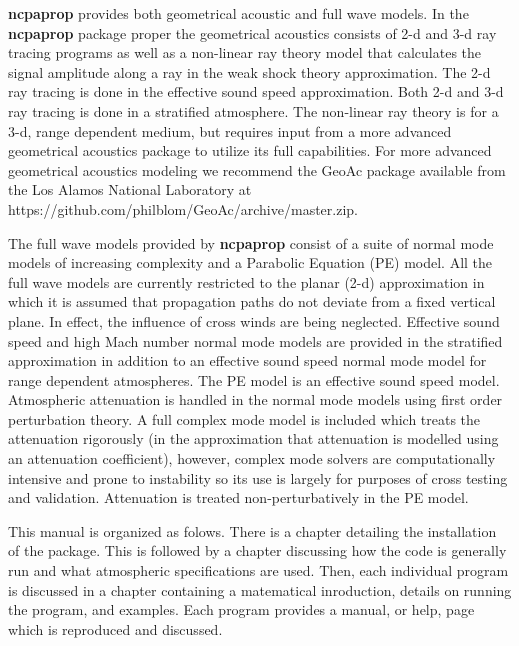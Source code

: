 \textbf{ncpaprop} provides both geometrical acoustic and full wave models. In the \textbf{ncpaprop} package proper the geometrical acoustics consists of 2-d and 3-d ray tracing programs as well as a non-linear ray theory model that calculates the signal amplitude along a ray in the weak shock theory approximation. The 2-d ray tracing is done in the effective sound speed approximation. Both 2-d and 3-d ray tracing is done in a stratified atmosphere. The non-linear ray theory is for a 3-d, range dependent medium, but requires input from a more advanced geometrical acoustics package to utilize its full capabilities. For more advanced geometrical acoustics modeling we recommend the GeoAc package available from the Los Alamos National Laboratory at https://github.com/philblom/GeoAc/archive/master.zip. 

The full wave models provided by \textbf{ncpaprop} consist of a suite of normal mode models of increasing complexity and a Parabolic Equation (PE) model. All the full wave models are currently restricted to the planar (2-d) approximation in which it is assumed that propagation paths do not deviate from a fixed vertical plane. In effect, the influence of cross winds are being neglected. Effective sound speed and high Mach number normal mode models are provided in the stratified approximation in addition to an effective sound speed normal mode model for range dependent atmospheres. The PE model is an effective sound speed model. Atmospheric attenuation is handled in the normal mode models using first order perturbation theory. A full complex mode model is included which treats the attenuation rigorously (in the approximation that attenuation is modelled using an attenuation coefficient), however, complex mode solvers are computationally intensive and prone to instability so its use is largely for purposes of cross testing and validation. Attenuation is treated non-perturbatively in the PE model. 

This manual is organized as folows. There is a chapter detailing the installation of the package. This is followed by a chapter discussing how the code is generally run and what atmospheric specifications are used. Then, each individual program is discussed in a chapter containing a matematical inroduction, details on running the program, and examples. Each program provides a manual, or help, page which is reproduced and discussed. 